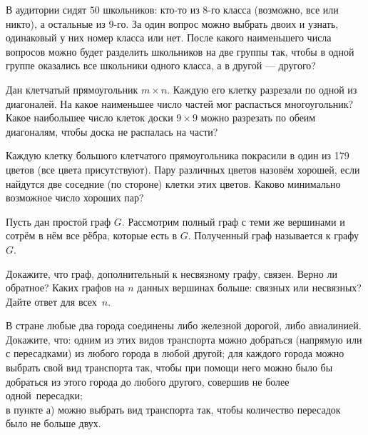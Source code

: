 \documentclass[12pt,a4paper]{article}
\begin{document}
В аудитории %
сидят $50$ школьников: кто-то из 8-го класса (возможно, все или никто), а остальные из 9-го. За один вопрос можно выбрать двоих и узнать, одинаковый у них номер класса или нет. После какого наименьшего числа вопросов можно будет разделить школьников на две группы так, чтобы
в одной группе оказались все школьники одного класса, а в другой --- другого? %

Дан клетчатый прямоугольник $m\times n$. Каждую его клетку разрезали по одной из диагоналей. На какое наименьшее число частей мог распасться многоугольник?
 Какое наибольшее число клеток доски $9\times9$ можно разрезать по обеим диагоналям, чтобы доска не распалась на части?

 Каждую клетку большого клетчатого прямоугольника покрасили в один из 179 цветов (все цвета присутствуют). Пару различных цветов назовём хорошей, если найдутся две соседние (по стороне) клетки этих цветов. Каково минимально возможное число хороших пар?

Пусть дан простой граф $G$. Рассмотрим полный граф с теми же вершинами и сотрём в нём все рёбра, которые есть в $G$. Полученный граф называется  к графу $G$.

 Докажите, что граф, дополнительный к несвязному графу, связен.  Верно ли обратное?
 Каких графов на $n$ данных вершинах больше: связных или несвязных?
Дайте ответ для всех~$n$.

В стране любые два города соединены либо железной дорогой, либо авиалинией. Докажите, что:
 одним из этих видов транспорта можно добраться (напрямую или с пересадками)  из любого города в любой другой;
 для каждого города можно выбрать свой вид транспорта так, чтобы при помощи него можно было бы добраться из этого города до любого другого, совершив не более одной~пересадки;\\
в пункте а) можно выбрать вид транспорта так, чтобы количество пересадок было не больше двух.
\end{document}
